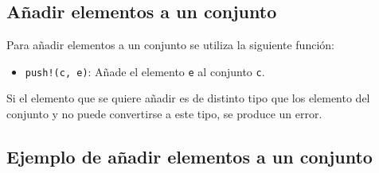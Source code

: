 \documentclass[
  letterpaper,
  DIV=11,
  numbers=noendperiod]{scrreprt}
\providecommand{\tightlist}{%
  \setlength{\itemsep}{0pt}\setlength{\parskip}{0pt}}\usepackage{longtable,booktabs,array}
\begin{document}
\hypertarget{auxf1adir-elementos-a-un-conjunto}{%
\subsection{Añadir elementos a un
conjunto}\label{auxf1adir-elementos-a-un-conjunto}}

Para añadir elementos a un conjunto se utiliza la siguiente función:

\begin{itemize}
\tightlist
\item
  \texttt{push!(c,\ e)}: Añade el elemento \texttt{e} al conjunto
  \texttt{c}.
\end{itemize}

\begin{tcolorbox}[enhanced jigsaw, colbacktitle=quarto-callout-warning-color!10!white, coltitle=black, opacityback=0, opacitybacktitle=0.6, bottomtitle=1mm, leftrule=.75mm, toprule=.15mm, bottomrule=.15mm, toptitle=1mm, breakable, colframe=quarto-callout-warning-color-frame, colback=white, rightrule=.15mm, titlerule=0mm, title=\textcolor{quarto-callout-warning-color}{\faExclamationTriangle}\hspace{0.5em}{Warning}, arc=.35mm, left=2mm]
Si el elemento que se quiere añadir es de distinto tipo que los elemento
del conjunto y no puede convertirse a este tipo, se produce un error.
\end{tcolorbox}

\hypertarget{ejemplo-de-auxf1adir-elementos-a-un-conjunto}{%
\subsection{Ejemplo de añadir elementos a un
conjunto}\label{ejemplo-de-auxf1adir-elementos-a-un-conjunto}}
\end{document}
